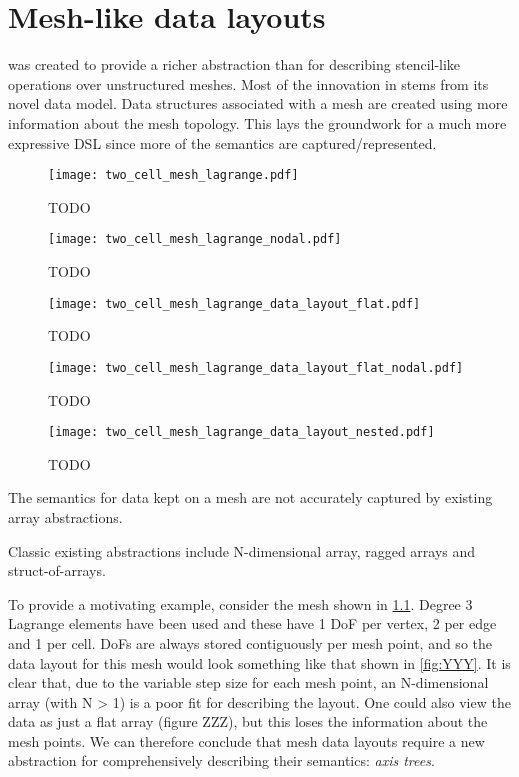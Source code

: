 \documentclass[thesis]{subfiles}
\begin{document}
\chapter{Mesh-like data layouts}
\label{chapter:mesh_data_layouts}

 was created to provide a richer abstraction than  for describing stencil-like operations over unstructured meshes.
Most of the innovation in  stems from its novel data model.
Data structures associated with a mesh are created using more information about the mesh topology.
This lays the groundwork for a much more expressive DSL since more of the semantics are captured/represented.

\begin{figure}
  \centering
  \texttt{[image: two\_cell\_mesh\_lagrange.pdf]}
  \caption{TODO}
  \label{fig:two_cell_mesh_lagrange}
\end{figure}

\begin{figure}
  \centering
  \texttt{[image: two\_cell\_mesh\_lagrange\_nodal.pdf]}
  \caption{TODO}
  \label{fig:two_cell_mesh_lagrange_nodal}
\end{figure}

\begin{figure}
  \centering
  \texttt{[image: two\_cell\_mesh\_lagrange\_data\_layout\_flat.pdf]}
  \caption{TODO}
  \label{fig:two_cell_mesh_lagrange_data_layout_flat}
\end{figure}

\begin{figure}
  \centering
  \texttt{[image: two\_cell\_mesh\_lagrange\_data\_layout\_flat\_nodal.pdf]}
  \caption{TODO}
  \label{fig:two_cell_mesh_lagrange_data_layout_flat_nodal}
\end{figure}

\begin{figure}
  \centering
  \texttt{[image: two\_cell\_mesh\_lagrange\_data\_layout\_nested.pdf]}
  \caption{TODO}
  \label{fig:two_cell_mesh_lagrange_data_layout_nested}
\end{figure}

The semantics for data kept on a mesh are not accurately captured by existing array abstractions.

Classic existing abstractions include N-dimensional array, ragged arrays and struct-of-arrays.

To provide a motivating example, consider the mesh shown in \cref{fig:two_cell_mesh_lagrange}. %
Degree 3 Lagrange elements have been used and these have 1 DoF per vertex, 2 per edge and 1 per cell.
DoFs are always stored contiguously per mesh point, and so the data layout for this mesh would look something like that shown in \cref{fig:YYY}.  %
It is clear that, due to the variable step size for each mesh point, an N-dimensional array (with N > 1) is a poor fit for describing the layout.
One could also view the data as just a flat array (figure ZZZ), but this loses the information about the mesh points.  %
We can therefore conclude that mesh data layouts require a new abstraction for comprehensively describing their semantics: \textit{axis trees}.
\end{document}
